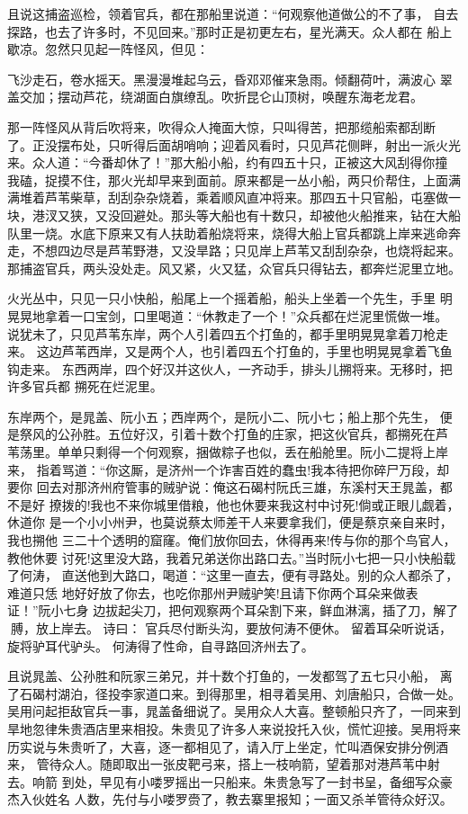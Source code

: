 且说这捕盗巡检，领着官兵，都在那船里说道：“何观察他道做公的不了事，
自去探路，也去了许多时，不见回来。”那时正是初更左右，星光满天。众人都在
船上歇凉。忽然只见起一阵怪风，但见：

飞沙走石，卷水摇天。黑漫漫堆起乌云，昏邓邓催来急雨。倾翻荷叶，满波心
翠盖交加；摆动芦花，绕湖面白旗缭乱。吹折昆仑山顶树，唤醒东海老龙君。

那一阵怪风从背后吹将来，吹得众人掩面大惊，只叫得苦，把那缆船索都刮断
了。正没摆布处，只听得后面胡哨响；迎着风看时，只见芦花侧畔，射出一派火光
来。众人道：“今番却休了！”那大船小船，约有四五十只，正被这大风刮得你撞
我磕，捉摸不住，那火光却早来到面前。原来都是一丛小船，两只价帮住，上面满
满堆着芦苇柴草，刮刮杂杂烧着，乘着顺风直冲将来。那四五十只官船，屯塞做一
块，港汊又狭，又没回避处。那头等大船也有十数只，却被他火船推来，钻在大船
队里一烧。水底下原来又有人扶助着船烧将来，烧得大船上官兵都跳上岸来逃命奔
走，不想四边尽是芦苇野港，又没旱路；只见岸上芦苇又刮刮杂杂，也烧将起来。
那捕盗官兵，两头没处走。风又紧，火又猛，众官兵只得钻去，都奔烂泥里立地。

火光丛中，只见一只小快船，船尾上一个摇着船，船头上坐着一个先生，手里
明晃晃地拿着一口宝剑，口里喝道：“休教走了一个！”众兵都在烂泥里慌做一堆。
说犹未了，只见芦苇东岸，两个人引着四五个打鱼的，都手里明晃晃拿着刀枪走来。
这边芦苇西岸，又是两个人，也引着四五个打鱼的，手里也明晃晃拿着飞鱼钩走来。
东西两岸，四个好汉并这伙人，一齐动手，排头儿搠将来。无移时，把许多官兵都
搠死在烂泥里。

东岸两个，是晁盖、阮小五；西岸两个，是阮小二、阮小七；船上那个先生，
便是祭风的公孙胜。五位好汉，引着十数个打鱼的庄家，把这伙官兵，都搠死在芦
苇荡里。单单只剩得一个何观察，捆做粽子也似，丢在船舱里。阮小二提将上岸来，
指着骂道：“你这厮，是济州一个诈害百姓的蠢虫!我本待把你碎尸万段，却要你
回去对那济州府管事的贼驴说：俺这石碣村阮氏三雄，东溪村天王晁盖，都不是好
撩拨的!我也不来你城里借粮，他也休要来我这村中讨死!倘或正眼儿觑着，休道你
是一个小小州尹，也莫说蔡太师差干人来要拿我们，便是蔡京亲自来时，我也搠他
三二十个透明的窟窿。俺们放你回去，休得再来!传与你的那个鸟官人，教他休要
讨死!这里没大路，我着兄弟送你出路口去。”当时阮小七把一只小快船载了何涛，
直送他到大路口，喝道：“这里一直去，便有寻路处。别的众人都杀了，难道只恁
地好好放了你去，也吃你那州尹贼驴笑!且请下你两个耳朵来做表证！”阮小七身
边拔起尖刀，把何观察两个耳朵割下来，鲜血淋漓，插了刀，解了膊，放上岸去。
诗曰：
官兵尽付断头沟，要放何涛不便休。
留着耳朵听说话，旋将驴耳代驴头。
何涛得了性命，自寻路回济州去了。

且说晁盖、公孙胜和阮家三弟兄，并十数个打鱼的，一发都驾了五七只小船，
离了石碣村湖泊，径投李家道口来。到得那里，相寻着吴用、刘唐船只，合做一处。
吴用问起拒敌官兵一事，晁盖备细说了。吴用众人大喜。整顿船只齐了，一同来到
旱地忽律朱贵酒店里来相投。朱贵见了许多人来说投托入伙，慌忙迎接。吴用将来
历实说与朱贵听了，大喜，逐一都相见了，请入厅上坐定，忙叫酒保安排分例酒来，
管待众人。随即取出一张皮靶弓来，搭上一枝响箭，望着那对港芦苇中射去。响箭
到处，早见有小喽罗摇出一只船来。朱贵急写了一封书呈，备细写众豪杰入伙姓名
人数，先付与小喽罗赍了，教去寨里报知；一面又杀羊管待众好汉。

